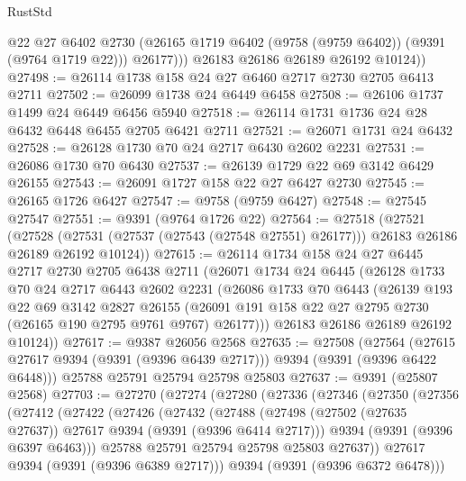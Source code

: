\begin{lexlean}{RustStd}
\begin{coremodule}
              @22
              @27
              @6402
              @2730
              (@26165 @1719 @6402 (@9758 (@9759 @6402)) (@9391 (@9764 @1719 @22)))
              @26177)))
        @26183
        @26186
        @26189
        @26192
        @10124))
@27498 := @26114 @1738 @158 @24 @27 @6460 @2717 @2730 @2705 @6413 @2711
@27502 := @26099 @1738 @24 @6449 @6458
@27508 := @26106 @1737 @1499 @24 @6449 @6456 @5940
@27518 := @26114 @1731 @1736 @24 @28 @6432 @6448 @6455 @2705 @6421 @2711
@27521 := @26071 @1731 @24 @6432
@27528 := @26128 @1730 @70 @24 @2717 @6430 @2602 @2231
@27531 := @26086 @1730 @70 @6430
@27537 := @26139 @1729 @22 @69 @3142 @6429 @26155
@27543 := @26091 @1727 @158 @22 @27 @6427 @2730
@27545 := @26165 @1726 @6427
@27547 := @9758 (@9759 @6427)
@27548 := @27545 @27547
@27551 := @9391 (@9764 @1726 @22)
@27564 := @27518
    (@27521
      (@27528 (@27531 (@27537 (@27543 (@27548 @27551) @26177))) @26183 @26186 @26189 @26192 @10124))
@27615 := @26114
    @1734
    @158
    @24
    @27
    @6445
    @2717
    @2730
    @2705
    @6438
    @2711
    (@26071
      @1734
      @24
      @6445
      (@26128
        @1733
        @70
        @24
        @2717
        @6443
        @2602
        @2231
        (@26086
          @1733
          @70
          @6443
          (@26139
            @193
            @22
            @69
            @3142
            @2827
            @26155
            (@26091 @191 @158 @22 @27 @2795 @2730 (@26165 @190 @2795 @9761 @9767) @26177)))
        @26183
        @26186
        @26189
        @26192
        @10124))
@27617 := @9387 @26056 @2568
@27635 := @27508
    (@27564 (@27615 @27617 @9394 (@9391 (@9396 @6439 @2717))) @9394 (@9391 (@9396 @6422 @6448)))
    @25788
    @25791
    @25794
    @25798
    @25803
@27637 := @9391 (@25807 @2568)
@27703 := @27270
    (@27274
      (@27280
        (@27336
          (@27346
            (@27350
              (@27356
                (@27412
                  (@27422
                    (@27426
                      (@27432
                        (@27488
                          (@27498 (@27502 (@27635 @27637)) @27617 @9394 (@9391 (@9396 @6414 @2717)))
                          @9394
                          (@9391 (@9396 @6397 @6463)))
                        @25788
                        @25791
                        @25794
                        @25798
                        @25803
                        @27637))
                    @27617
                    @9394
                    (@9391 (@9396 @6389 @2717)))
                  @9394
                  (@9391 (@9396 @6372 @6478)))

\end{coremodule}
\end{lexlean}

